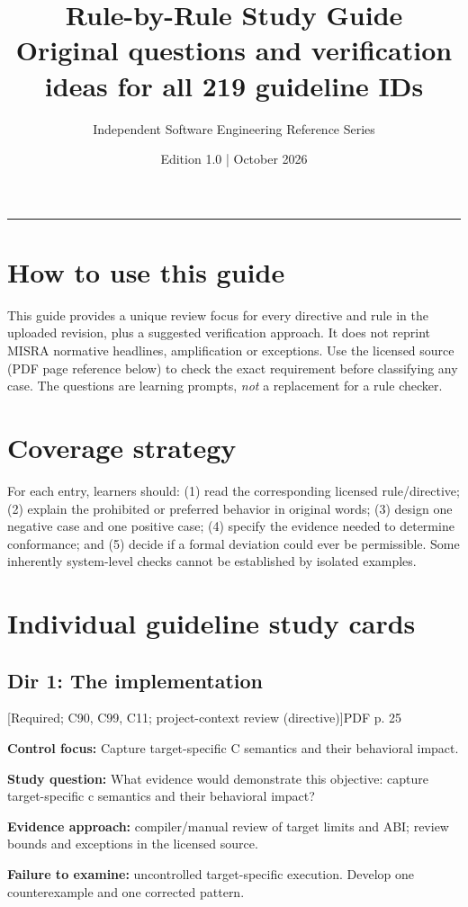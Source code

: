 \documentclass[10pt,letterpaper]{article}
\title{\vspace{-2.3em}\color{DeepNavy}\Huge\bfseries Rule-by-Rule Study Guide\\[0.45em]\large\normalfont\color{Teal} Original questions and verification ideas for all 219 guideline IDs}
\author{Independent Software Engineering Reference Series}
\date{Edition 1.0 \quad | \quad October 2026}
\begin{document}
\maketitle
\vspace{-0.4em}
\begin{center}\color{Slate}\rule{0.83\linewidth}{0.4pt}\end{center}
\DocNotes
\tableofcontents
\newpage

\section{How to use this guide}
This guide provides a unique review focus for every directive and rule in the uploaded revision, plus a suggested verification approach. It does not reprint MISRA normative headlines, amplification or exceptions. Use the licensed source (PDF page reference below) to check the exact requirement before classifying any case. The questions are learning prompts, \emph{not} a replacement for a rule checker.
\section{Coverage strategy}
For each entry, learners should: (1) read the corresponding licensed rule/directive; (2) explain the prohibited or preferred behavior in original words; (3) design one negative case and one positive case; (4) specify the evidence needed to determine conformance; and (5) decide if a formal deviation could ever be permissible. Some inherently system-level checks cannot be established by isolated examples.
\section{Individual guideline study cards}
\subsection{Dir 1: The implementation}
 \textsf{\footnotesize [Required; C90, C99, C11; project-context review (directive)]}\hfill{\footnotesize PDF p. 25}\par
\textbf{Control focus:} Capture target-specific C semantics and their behavioral impact.\par
\textbf{Study question:} What evidence would demonstrate this objective: capture target-specific c semantics and their behavioral impact?\par
\textbf{Evidence approach:} compiler/manual review of target limits and ABI; review bounds and exceptions in the licensed source.\par
\textbf{Failure to examine:} uncontrolled target-specific execution. Develop one counterexample and one corrected pattern.\par
\smallskip
\end{document}
